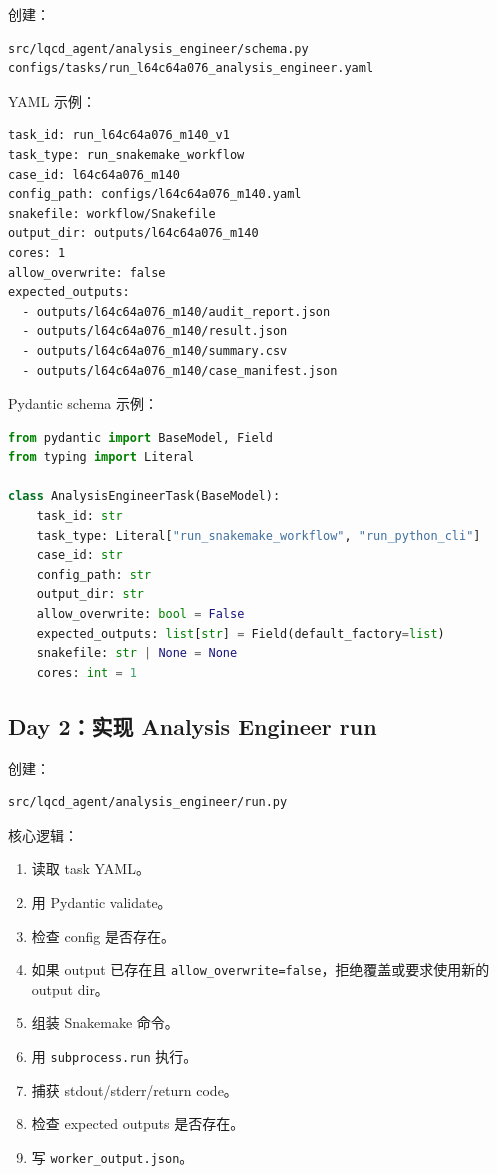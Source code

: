 \documentclass[11pt,a4paper,fontset=none]{ctexart}
\begin{document}
创建：

\begin{lstlisting}
src/lqcd_agent/analysis_engineer/schema.py
configs/tasks/run_l64c64a076_analysis_engineer.yaml
\end{lstlisting}

YAML 示例：

\begin{lstlisting}
task_id: run_l64c64a076_m140_v1
task_type: run_snakemake_workflow
case_id: l64c64a076_m140
config_path: configs/l64c64a076_m140.yaml
snakefile: workflow/Snakefile
output_dir: outputs/l64c64a076_m140
cores: 1
allow_overwrite: false
expected_outputs:
  - outputs/l64c64a076_m140/audit_report.json
  - outputs/l64c64a076_m140/result.json
  - outputs/l64c64a076_m140/summary.csv
  - outputs/l64c64a076_m140/case_manifest.json
\end{lstlisting}

Pydantic schema 示例：

\begin{lstlisting}[language=Python]
from pydantic import BaseModel, Field
from typing import Literal

class AnalysisEngineerTask(BaseModel):
    task_id: str
    task_type: Literal["run_snakemake_workflow", "run_python_cli"]
    case_id: str
    config_path: str
    output_dir: str
    allow_overwrite: bool = False
    expected_outputs: list[str] = Field(default_factory=list)
    snakefile: str | None = None
    cores: int = 1
\end{lstlisting}

\subsection{Day 2：实现 Analysis Engineer run}

创建：

\begin{lstlisting}
src/lqcd_agent/analysis_engineer/run.py
\end{lstlisting}

核心逻辑：

\begin{enumerate}[leftmargin=2em]
  \item 读取 task YAML。
  \item 用 Pydantic validate。
  \item 检查 config 是否存在。
  \item 如果 output 已存在且 \texttt{allow\_overwrite=false}，拒绝覆盖或要求使用新的 output dir。
  \item 组装 Snakemake 命令。
  \item 用 \texttt{subprocess.run} 执行。
  \item 捕获 stdout/stderr/return code。
  \item 检查 expected outputs 是否存在。
  \item 写 \texttt{worker\_output.json}。
\end{enumerate}
\end{document}
